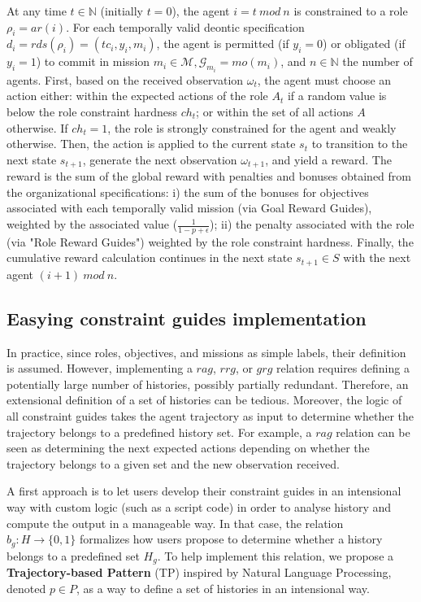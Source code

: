 \documentclass[pdflatex,sn-mathphys-num]{sn-jnl}%
\theoremstyle{thmstyleone}%
\theoremstyle{thmstyletwo}%
\theoremstyle{thmstylethree}%
\begin{document}
At any time $t \in \mathbb{N}$ (initially $t = 0$), the agent $i = t \ mod \ n$ is constrained to a role $\rho_i = ar(i)$. For each temporally valid deontic specification $d_i = rds(\rho_i) = (tc_i,y_i, m_i)$, the agent is permitted (if $y_i = 0$) or obligated (if $y_i = 1$) to commit in mission $m_i \in \mathcal{M}, \mathcal{G}_{m_i} = mo(m_i)$, and $n \in \mathbb{N}$ the number of agents.
%
First, based on the received observation $\omega_t$, the agent must choose an action either: within the expected actions of the role $A_t$ if a random value is below the role constraint hardness $ch_t$; or within the set of all actions $A$ otherwise. If $ch_t = 1$, the role is strongly constrained for the agent and weakly otherwise.
%
Then, the action is applied to the current state $s_t$ to transition to the next state $s_{t+1}$, generate the next observation $\omega_{t+1}$, and yield a reward. The reward is the sum of the global reward with penalties and bonuses obtained from the organizational specifications: \quad i) the sum of the bonuses for objectives associated with each temporally valid mission (via Goal Reward Guides), weighted by the associated value ($\frac{1}{1-p+\epsilon}$); \quad ii) the penalty associated with the role (via "Role Reward Guides") weighted by the role constraint hardness.
%
Finally, the cumulative reward calculation continues in the next state $s_{t+1} \in S$ with the next agent $(i+1) \ mod \ n$.

\subsection{Easying constraint guides implementation}

In practice, since roles, objectives, and missions as simple labels, their definition is assumed. However, implementing a $rag$, $rrg$, or $grg$ relation requires defining a potentially large number of histories, possibly partially redundant. Therefore, an extensional definition of a set of histories can be tedious. Moreover, the logic of all constraint guides takes the agent trajectory as input to determine whether the trajectory belongs to a predefined history set. For example, a $rag$ relation can be seen as determining the next expected actions depending on whether the trajectory belongs to a given set and the new observation received.

A first approach is to let users develop their constraint guides in an intensional way with custom logic (such as a script code) in order to analyse history and compute the output in a manageable way. In that case, the relation $b_g: H \to \{0,1\}$ formalizes how users propose to determine whether a history belongs to a predefined set $H_g$.
To help implement this relation, we propose a \textbf{Trajectory-based Pattern} (TP) inspired by Natural Language Processing, denoted $p \in P$, as a way to define a set of histories in an intensional way.
\end{document}
